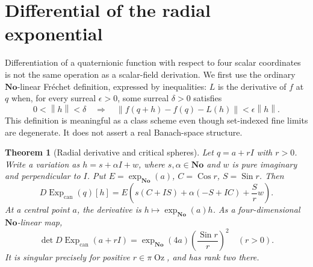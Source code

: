 \documentclass[11pt,letterpaper]{article}
\newtheorem{theorem}{Theorem}[section]
\theoremstyle{definition}
\newcommand{\No}{\mathbf{No}}
\newcommand{\norm}[1]{\left\lVert#1\right\rVert}
\DeclareMathOperator{\Sin}{Sin}
\DeclareMathOperator{\Cos}{Cos}
\DeclareMathOperator{\Oz}{Oz}
\newcommand{\ExpC}{\operatorname{Exp}_{\mathrm{can}}}
\begin{document}
\section{Differential of the radial exponential}
\label{sec:differential}
Differentiation of a quaternionic function with respect to four scalar
coordinates is not the same operation as a scalar-field derivation. We first
use the ordinary $\No$-linear Fr\'echet definition, expressed by inequalities:
$L$ is the derivative of $f$ at $q$ when, for every surreal $\epsilon>0$, some
surreal $\delta>0$ satisfies
\[
 0<\norm h<\delta\quad\Longrightarrow\quad
 \norm{f(q+h)-f(q)-L(h)}<\epsilon\norm h.
\]
This definition is meaningful as a class scheme even though set-indexed fine
limits are degenerate. It does not assert a real Banach-space structure.

\begin{theorem}[Radial derivative and critical spheres]
\label{thm:exp-derivative}
Let $q=a+rI$ with $r>0$. Write a variation as
$h=s+\alpha I+w$, where $s,\alpha\in\No$ and $w$ is pure imaginary and
perpendicular to $I$. Put $E=\exp_{\No}(a)$, $C=\Cos r$, $S=\Sin r$. Then
\begin{equation}
 D\ExpC(q)[h]=E\left(s(C+IS)+\alpha(-S+IC)+\frac{S}{r}w\right).
 \label{eq:exp-derivative}
\end{equation}
At a central point $a$, the derivative is $h\mapsto\exp_{\No}(a)h$. As a
four-dimensional $\No$-linear map,
\begin{equation}
 \det D\ExpC(a+rI)=\exp_{\No}(4a)\left(\frac{\Sin r}{r}\right)^2
 \quad(r>0).
 \label{eq:exp-jacobian}
\end{equation}
It is singular precisely for positive $r\in\pi\Oz$, and has rank two there.
\end{theorem}
\end{document}
